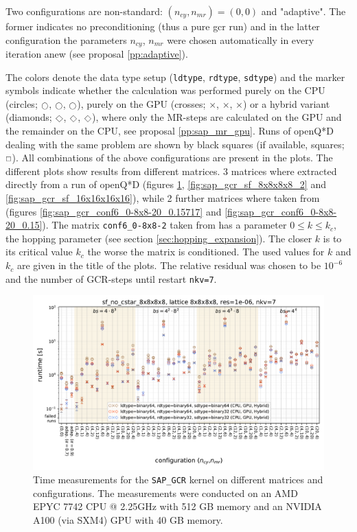 \documentclass{article}
\DeclareRobustCommand{\diamond}{%
  \mathbin{\text{\scalebox{.75}{\rotatebox[origin=c]{45}{$\Box$}}}}%
}
\DeclareRobustCommand{\msquare}{%
  \mathbin{\text{\scalebox{.75}{$\Box$}}}%
}
\DeclareRobustCommand{\mcirc}{%
  \mathbin{\text{\scalebox{.75}{$\bigcirc$}}}%
}
\theoremstyle{plain} %
\theoremstyle{convention} %
\theoremstyle{remark} %
\def\code#1{\texttt{#1}}
\numberwithin{equation}{section}
\begin{document}
Two configurations are non-standard: $(n_{cy}, n_{mr}) = (0,0)$ and "adaptive". The former indicates no preconditioning (thus a pure \acrshort{gcr} run) and in the latter configuration the parameters $n_{cy}$, $n_{mr}$ were chosen automatically in every iteration anew (see proposal \ref{pp:adaptive}).


The colors denote the data type setup (\code{ldtype}, \code{rdtype}, \code{sdtype}) and the marker symbols indicate whether the calculation was performed purely on the CPU (circles; \textcolor{cbrown}{$\mcirc$}, \textcolor{cred}{$\mcirc$}, \textcolor{cblue}{$\mcirc$}), purely on the GPU (crosses; \textcolor{cbrown}{$\times$}, \textcolor{cred}{$\times$}, \textcolor{cblue}{$\times$}) or a hybrid variant (diamonds; \textcolor{cbrown}{$\diamond$}, \textcolor{cred}{$\diamond$}, \textcolor{cblue}{$\diamond$}), where only the MR-steps are calculated on the GPU and the remainder on the CPU, see proposal \ref{pp:sap_mr_gpu}. Runs of openQ*D dealing with the same problem are shown by black squares (if available, squares; $\msquare$). All combinations of the above configurations are present in the plots. The different plots show results from different matrices. \num{3} matrices where extracted directly from a run of openQ*D (figures \ref{fig:sap_gcr_sf_8x8x8x8}, \ref{fig:sap_gcr_sf_8x8x8x8_2} and \ref{fig:sap_gcr_sf_16x16x16x16}), while \num{2} further matrices where taken from \cite{davis2011} (figures \ref{fig:sap_gcr_conf6_0-8x8-20_0.15717} and \ref{fig:sap_gcr_conf6_0-8x8-20_0.15}). The matrix \code{conf6\_0-8x8-2} taken from \cite{davis2011} has a parameter $0 \le k \le k_c$, the hopping parameter (see section \ref{sec:hopping_expansion}). The closer $k$ is to its critical value $k_c$ the worse the matrix is conditioned. The used values for $k$ and $k_c$ are given in the title of the plots. The relative residual was chosen to be $10^{-6}$ and the number of GCR-steps until restart \code{nkv=7}.

\begin{figure}[h]
    \centering
    \includegraphics[width=1.0\textwidth]{plots/sap_gcr_sf_no_cstar_8x8x8x8_lattice_8x8x8x8_res=1e-06_nkv=7}
    \caption{Time measurements for the \code{SAP\_GCR} kernel on different matrices and configurations. The measurements were conducted on an AMD EPYC 7742 CPU @ 2.25GHz with 512 GB memory and an NVIDIA A100 (via SXM4) GPU with 40 GB memory.}
    \label{fig:sap_gcr0}
    \label{fig:sap_gcr_start}
    \label{fig:sap_gcr_sf_8x8x8x8}
\end{figure}
\end{document}
